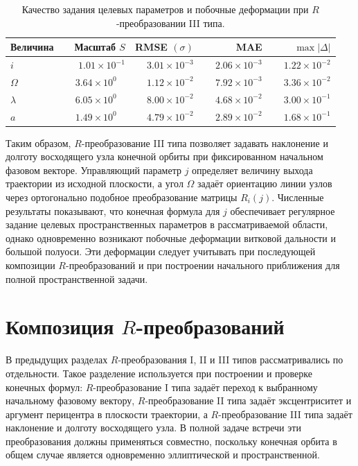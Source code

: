 \begin{table}[ht]
	\centering
	\caption{Качество задания целевых параметров и побочные деформации при \(R\)-преобразовании III типа.}
	\label{tab:R_type_III_metrics}
	\begin{tabular}{lrrrr}
		\toprule
		Величина & Масштаб \(S\) & RMSE \((\sigma)\) & MAE & \(\max |\Delta|\) \\
		\midrule
		\(i\) & \(\phantom{-}1.01\times10^{-1}\) & \(\phantom{-}3.01\times10^{-3}\) & \(\phantom{-}2.06\times10^{-3}\) & \(\phantom{-}1.22\times10^{-2}\) \\
		\(\Omega\) & \(\phantom{-}3.64\times10^{0\phantom{-}}\) & \(\phantom{-}1.12\times10^{-2}\) & \(\phantom{-}7.92\times10^{-3}\) & \(\phantom{-}3.36\times10^{-2}\) \\
		\(\lambda\) & \(\phantom{-}6.05\times10^{0\phantom{-}}\) & \(\phantom{-}8.00\times10^{-2}\) & \(\phantom{-}4.68\times10^{-2}\) & \(\phantom{-}3.00\times10^{-1}\) \\
		\(a\) & \(\phantom{-}1.49\times10^{0\phantom{-}}\) & \(\phantom{-}4.79\times10^{-2}\) & \(\phantom{-}2.89\times10^{-2}\) & \(\phantom{-}1.68\times10^{-1}\) \\
		\bottomrule
	\end{tabular}
\end{table}

Таким образом, \(R\)-преобразование III типа позволяет задавать наклонение и долготу восходящего узла конечной орбиты при фиксированном начальном фазовом векторе. Управляющий параметр \(j\) определяет величину выхода траектории из исходной плоскости, а угол \(\Omega\) задаёт ориентацию линии узлов через ортогонально подобное преобразование матрицы \(R_i(j)\). Численные результаты показывают, что конечная формула для \(j\) обеспечивает регулярное задание целевых пространственных параметров в рассматриваемой области, однако одновременно возникают побочные деформации витковой дальности и большой полуоси. Эти деформации следует учитывать при последующей композиции \(R\)-преобразований и при построении начального приближения для полной пространственной задачи.

\section{Композиция \(R\)-преобразований}

В предыдущих разделах \(R\)-преобразования I, II и III типов рассматривались по отдельности. Такое разделение используется при построении и проверке конечных формул: \(R\)-преобразование I типа задаёт переход к выбранному начальному фазовому вектору, \(R\)-преобразование II типа задаёт эксцентриситет и аргумент перицентра в плоскости траектории, а \(R\)-преобразование III типа задаёт наклонение и долготу восходящего узла. В полной задаче встречи эти преобразования должны применяться совместно, поскольку конечная орбита в общем случае является одновременно эллиптической и пространственной.

